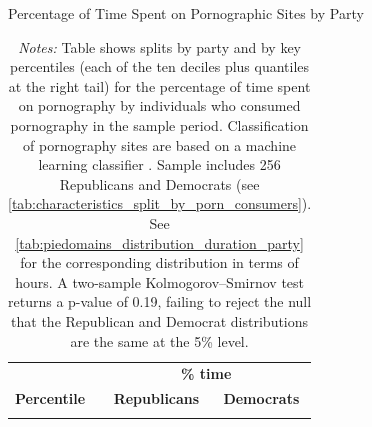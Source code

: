 \documentclass[12pt, letterpaper]{article}
\begin{document}
\begin{table}[ht] \centering \small \setlength\tabcolsep{10 pt}
	\caption{Percentage of Time Spent on Pornographic Sites by Party}
	\label{tab:piedomains_distribution_prop_duration_party}
	\begin{adjustbox}{max width=\textwidth}
		\begin{tabular}{crr}
			\toprule
			\multicolumn{1}{l}{\textbf{}}&\multicolumn{2}{c}{\textbf{\% time}}\\
			\cmidrule(l){2-3}
			\multicolumn{1}{l}{\textbf{Percentile}}&\multicolumn{1}{c}{\textbf{Republicans}}&\multicolumn{1}{c}{\textbf{Democrats}}\\
			\midrule
			\\
			\bottomrule
		\end{tabular}
	\end{adjustbox}
	\caption*{\footnotesize \emph{Notes:} 
		Table shows splits by party and by key percentiles (each of the ten deciles plus quantiles at the right tail) for the percentage of time spent on pornography by individuals who consumed pornography in the sample period. 
		Classification of pornography sites are based on a machine learning classifier \citep{Chintalapati_piedomains_Predict_the_2022}.
		Sample includes 256 Republicans and Democrats (see \cref{tab:characteristics_split_by_porn_consumers}).
		See \cref{tab:piedomains_distribution_duration_party} for the corresponding distribution in terms of hours.
		A two-sample Kolmogorov–Smirnov test returns a p-value of 0.19, failing to reject the null that the Republican and Democrat distributions are the same at the 5\% level.
	}
\end{table}
\end{document}
